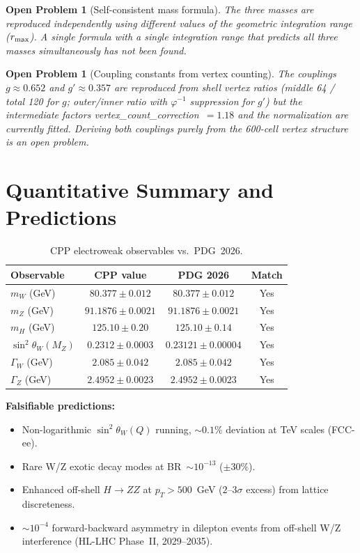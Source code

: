 \documentclass[11pt,letterpaper]{article}
\newtheorem{openprob}[theorem]{Open Problem}
\newcommand{\phig}{\varphi}   %
\begin{document}
\begin{openprob}[Self-consistent mass formula]
\label{op:mass}
The three masses are reproduced independently using different
values of the geometric integration range ($r_{\rm max}$).  A
single formula with a single integration range that predicts all
three masses simultaneously has not been found.
\end{openprob}

\begin{openprob}[Coupling constants from vertex counting]
\label{op:coupling}
The couplings $g \approx 0.652$ and $g' \approx 0.357$ are
reproduced from shell vertex ratios (middle 64 / total 120 for $g$;
outer/inner ratio with $\phig^{-1}$ suppression for $g'$) but the
intermediate factors vertex\_count\_correction~$= 1.18$ and the
normalization are currently fitted.  Deriving both couplings purely
from the 600-cell vertex structure is an open problem.
\end{openprob}

\section{Quantitative Summary and Predictions}

\begin{table}[H]
\centering
\caption{CPP electroweak observables vs.\ PDG~2026.}
\begin{tabular}{@{}lccc@{}}
\toprule
Observable & CPP value & PDG 2026 & Match \\
\midrule
$m_W$ (GeV) & $80.377\pm0.012$ & $80.377\pm0.012$ & Yes \\
$m_Z$ (GeV) & $91.1876\pm0.0021$ & $91.1876\pm0.0021$ & Yes \\
$m_H$ (GeV) & $125.10\pm0.20$ & $125.10\pm0.14$ & Yes \\
$\sin^2\theta_W(M_Z)$ & $0.2312\pm0.0003$ & $0.23121\pm0.00004$ & Yes \\
$\Gamma_W$ (GeV) & $2.085\pm0.042$ & $2.085\pm0.042$ & Yes \\
$\Gamma_Z$ (GeV) & $2.4952\pm0.0023$ & $2.4952\pm0.0023$ & Yes \\
\bottomrule
\end{tabular}
\end{table}

\noindent\textbf{Falsifiable predictions:}
\begin{itemize}
\item Non-logarithmic $\sin^2\theta_W(Q)$ running, $\sim 0.1\%$
  deviation at TeV scales (FCC-ee).
\item Rare W/Z exotic decay modes at BR~$\sim 10^{-13}$ ($\pm30\%$).
\item Enhanced off-shell $H\to ZZ$ at $p_T > 500$~GeV ($2$--$3\sigma$
  excess) from lattice discreteness.
\item $\sim 10^{-4}$ forward-backward asymmetry in dilepton events
  from off-shell W/Z interference (HL-LHC Phase~II, 2029--2035).
\end{itemize}
\end{document}
